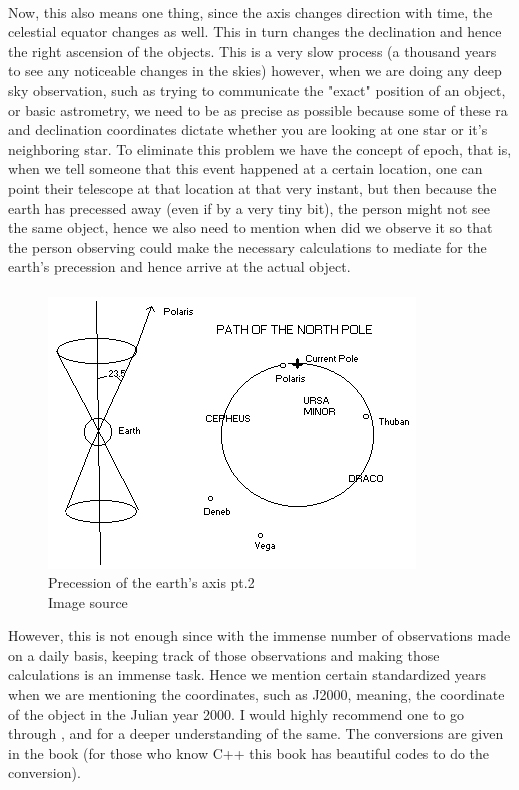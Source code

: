 \documentclass[a4paper,twoside]{article}
\numberwithin{equation}{section}
\begin{document}
\paragraph{}
Now, this also means one thing, since the axis changes direction with time, the celestial equator changes as well. This in turn changes the declination and hence the right ascension of the objects. This is a very slow process (a thousand years to see any noticeable changes in the skies) however, when we are doing any deep sky observation, such as trying to communicate the "exact" position of an object, or basic astrometry, we need to be as precise as possible because some of these ra and declination coordinates dictate whether you are looking at one star or it's neighboring star. To eliminate this problem we have the concept of epoch, that is, when we tell someone that this event happened at a certain location, one can point their telescope at that location at that very instant, but then because the earth has precessed away (even if by a very tiny bit), the person might not see the same object, hence we also need to mention when did we observe it so that the person observing could make the necessary calculations to mediate for the earth's precession and hence arrive at the actual object. 
\paragraph{}
\begin{figure}
\begin{center}
\includegraphics[width=0.8\linewidth]{fig5.png} 
\caption{Precession of the earth's axis pt.2 \\ Image source \cite{precession3}}
\label{fig5}
\end{center}
\end{figure}
However, this is not enough since with the immense number of observations made on a daily basis, keeping track of those observations and making those calculations is an immense task. Hence we mention certain standardized years when we are mentioning the coordinates, such as J2000, meaning, the coordinate of the object in the Julian year 2000. I would highly recommend one to go through \cite{epoch1}, \cite{epoch2} and \cite{epoch3} for a deeper understanding of the same. The conversions are given in the book \cite{epoch4} (for those who know C++ this book has beautiful codes to do the conversion). 
\end{document}
